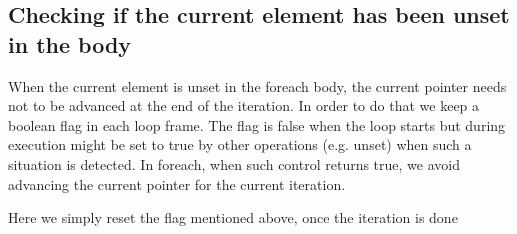 \documentclass{article}
\begin{document}
\begin{kdefinition}
\begin{module}{}
\begin{syntaxBlock}{}
\end{syntaxBlock}

\begin{syntaxBlock}{}
\end{syntaxBlock}
\begin{kblock}[text]
 \subsection{Checking if the current element has been unset in the body} 
		When the current element is unset in the foreach body, the current pointer 
		needs not to be advanced at the end of the iteration. 
		In order to do that we keep a boolean flag in each loop frame. The flag is false
		when the loop starts but during execution might be set to true by other operations
		(e.g. unset) when such a situation is detected.
		In foreach, when such control returns true, we avoid advancing the current 
		pointer for the current iteration. \end{kblock}

\begin{syntaxBlock}{}
\end{syntaxBlock}
\begin{kblock}[text]
 Here we simply reset the flag mentioned above, once the iteration is done\end{kblock}


\end{module}
\end{kdefinition}
\end{document}
